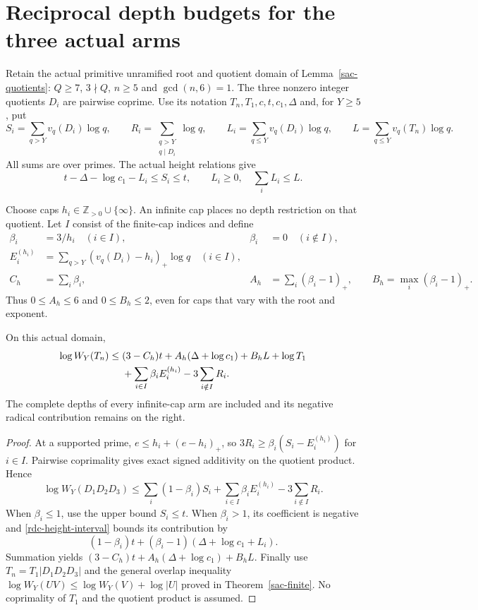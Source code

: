 \section{Reciprocal depth budgets for the three actual arms}
\label{rdc-section}

Retain the actual primitive unramified root and quotient domain of
Lemma~\ref{sac-quotients}: $Q\ge7$, $3\nmid Q$, $n\ge5$ and
$\gcd(n,6)=1$. The three nonzero integer quotients $D_i$ are
pairwise coprime. Use its notation $T_n,T_1,c,t,c_1,\Delta$ and,
for $Y\ge5$, put
\[
 S_i=\sum_{q>Y}v_q(D_i)\log q,\qquad
 R_i=\sum_{\substack{q>Y\\q\mid D_i}}\log q,\qquad
 L_i=\sum_{q\le Y}v_q(D_i)\log q,\qquad
 L=\sum_{q\le Y}v_q(T_n)\log q.
\]
All sums are over primes. The actual height relations give
\begin{equation}\label{rdc-height-interval}
 t-\Delta-\log c_1-L_i\le S_i\le t,\qquad
 L_i\ge0,\quad \sum_iL_i\le L.
\end{equation}

Choose caps $h_i\in\mathbb Z_{>0}\cup\{\infty\}$. An infinite cap
places no depth restriction on that quotient. Let $I$ consist of the
finite-cap indices and define
\begin{align*}
 \beta_i&=3/h_i\quad(i\in I),& \beta_i&=0\quad(i\notin I),\\
 E_i^{(h_i)}&=\sum_{q>Y}(v_q(D_i)-h_i)_+\log q\quad(i\in I),&&\\
 C_h&=\sum_i\beta_i,& A_h&=\sum_i(\beta_i-1)_+,\qquad
 B_h=\max_i(\beta_i-1)_+.
\end{align*}
Thus $0\le A_h\le6$ and $0\le B_h\le2$, even for caps that vary
with the root and exponent.

\begin{theorem}\label{rdc-finite}
On this actual domain,
\begin{align}
 \log W_Y(T_n)\le{}&(3-C_h)t+A_h(\Delta+\log c_1)
                    +B_hL+\log T_1\notag\\
                 &+\sum_{i\in I}\beta_iE_i^{(h_i)}
                    -3\sum_{i\notin I}R_i.
                    \label{rdc-finite-bound}
\end{align}
The complete depths of every infinite-cap arm are included and its
negative radical contribution remains on the right.
\end{theorem}
\begin{proof}
At a supported prime, $e\le h_i+(e-h_i)_+$, so
$3R_i\ge\beta_i(S_i-E_i^{(h_i)})$ for $i\in I$.
Pairwise coprimality gives exact signed additivity on the quotient
product. Hence
\[
 \log W_Y(D_1D_2D_3)
 \le\sum_i(1-\beta_i)S_i+
       \sum_{i\in I}\beta_iE_i^{(h_i)}-3\sum_{i\notin I}R_i.
\]
When $\beta_i\le1$, use the upper bound $S_i\le t$. When
$\beta_i>1$, its coefficient is negative and
\eqref{rdc-height-interval} bounds its contribution by
\[
 (1-\beta_i)t+(\beta_i-1)(\Delta+\log c_1+L_i).
\]
Summation yields $(3-C_h)t+A_h(\Delta+\log c_1)+B_hL$.
Finally use $T_n=T_1|D_1D_2D_3|$ and the general overlap inequality
$\log W_Y(UV)\le\log W_Y(V)+\log|U|$ proved in
Theorem~\ref{sac-finite}. No coprimality of $T_1$ and the quotient
product is assumed.
\end{proof}

